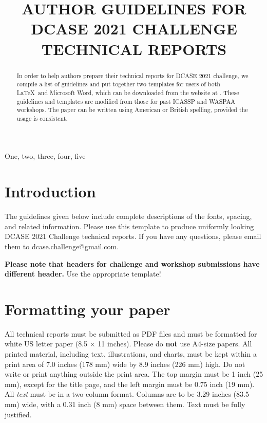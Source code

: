 \documentclass{article}
\title{AUTHOR GUIDELINES FOR DCASE 2021 CHALLENGE TECHNICAL REPORTS}
\begin{document}
\ninept
\maketitle

\begin{sloppy}

\begin{abstract}
In order to help authors prepare their technical reports for DCASE 2021 challenge, we compile a list of guidelines and put together two templates for users of both \LaTeX\ and Microsoft Word, which can be downloaded from the website at \cite{dcase2021web}. These guidelines and templates are modified from those for past ICASSP and WASPAA workshops. The paper can be written using American or British spelling, provided the usage is consistent.
\end{abstract}

\begin{keywords}
One, two, three, four, five
\end{keywords}


\section{Introduction}
\label{sec:intro}

The guidelines given below include complete descriptions of the fonts, spacing, and related information. Please use this template to produce uniformly looking DCASE 2021 Challenge technical reports.
If you have any questions, please email them to dcase.challenge@gmail.com.

\textbf{Please note that headers for challenge and workshop submissions have different header.} Use the appropriate template!




\section{Formatting your paper}
\label{sec:format}

All technical reports must be submitted as PDF files and must be formatted for white US letter paper (8.5 $\times$ 11 inches). Please do {\bf not} use A4-size papers. All printed material, including text, illustrations, and charts, must be kept within a print area of 7.0 inches (178 mm) wide by 8.9 inches (226 mm) high. Do not write or print anything outside the print area. The top margin must be 1 inch (25 mm), except for the title page, and the left margin must be 0.75 inch (19 mm).  All {\it text} must be in a two-column format. Columns are to be 3.29 inches (83.5 mm) wide, with a 0.31 inch (8 mm) space between them. Text must be fully justified. 


\end{sloppy}
\end{document}
